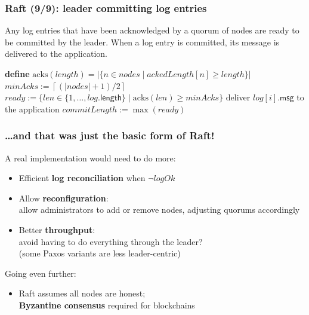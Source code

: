 \begin{frame}
    \label{s:raft9}
    \frametitle{Raft (9/9): leader committing log entries}
    \footnotesize
    Any log entries that have been acknowledged by a quorum of nodes are ready to be committed by the leader.
    When a log entry is committed, its message is delivered to the application.\\[1em]
    \begin{algorithmic}
        \State \textbf{define} $\mathrm{acks}(\mathit{length}) = |\{n \in \mathit{nodes} \mid \mathit{ackedLength}[n] \ge \mathit{length}\}|$
        \State
            \State $\mathit{minAcks} := \left\lceil (|\mathit{nodes}| + 1)/2 \right\rceil$
            \State $\mathit{ready} := \{\mathit{len} \in \{1,\dots,\mathit{log}.\mathsf{length}\} \mid \mathrm{acks}(\mathit{len}) \ge \mathit{minAcks}\}$
                    \State deliver $\mathit{log}[i].\mathsf{msg}$ to the application
                \EndFor
                \State $\mathit{commitLength} := \max(\mathit{ready})$
            \EndIf
        \EndFunction
        \State
    \end{algorithmic}
\end{frame}
\label{l:raft9}

\begin{frame}
    \label{s:raft-end}
    \frametitle{{\dots}and that was just the basic form of Raft!}
    A real implementation would need to do more:
    \begin{itemize}
        \item Efficient \textbf{log reconciliation} when $\neg\mathit{logOk}$
        \item Allow \textbf{reconfiguration}:\\ allow administrators to add or remove nodes, adjusting quorums accordingly
        \item Better \textbf{throughput}:\\ avoid having to do everything through the leader? \\
            (some Paxos variants are less leader-centric) \pause\\[1em]
    \end{itemize}
    Going even further:
    \begin{itemize}
        \item Raft assumes all nodes are honest;\\
            \textbf{Byzantine consensus} required for blockchains
    \end{itemize}
\end{frame}
\label{l:raft-end}

